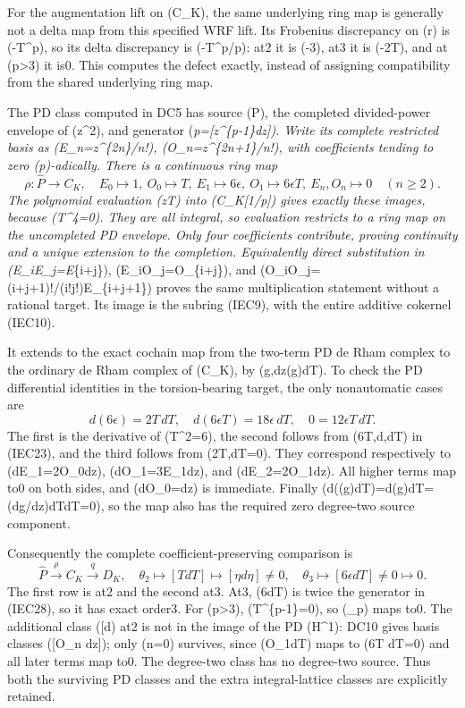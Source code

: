 \documentclass[
  10pt,
]{article}
\begin{document}
For the augmentation lift on (C\_K), the same underlying ring map is
generally not a delta map from this specified WRF lift. Its Frobenius
discrepancy on (r) is (-T\^{}p), so its delta discrepancy is
(-T\^{}p/p): at2 it is (-3\epsilon), at3 it is (-2\epsilon T), and at
(p\textgreater3) it is0. This computes the defect exactly, instead of
assigning compatibility from the shared underlying ring map.

The PD class computed in DC5 has source (\widehat P), the completed
divided-power envelope of (z\^{}2), and generator
(\theta\emph{p={[}z\^{}\{p-1\}dz{]}). Write its complete restricted
basis as (E\_n=z\^{}\{2n\}/n!), (O\_n=z\^{}\{2n+1\}/n!), with
coefficients tending to zero (p)-adically. There is a continuous ring
map \[
\rho:\widehat P\longrightarrow C_K,\quad
E_0\mapsto1,\ O_0\mapsto T,\ E_1\mapsto6\epsilon,
\ O_1\mapsto6\epsilon T,\ E_n,O_n\mapsto0\quad(n\ge2).
\tag{IEC38}
\] The polynomial evaluation (z\mapsto T) into (C\_K{[}1/p{]}) gives
exactly these images, because (T\^{}4=0). They are all integral, so
evaluation restricts to a ring map on the uncompleted PD envelope. Only
four coefficients contribute, proving continuity and a unique extension
to the completion. Equivalently direct substitution in
(E\_iE\_j=E}\{i+j\}), (E\_iO\_j=O\_\{i+j\}),
and (O\_iO\_j=(i+j+1)!/(i!j!)E\_\{i+j+1\}) proves the same
multiplication statement without a rational target. Its image is the
subring (IEC9), with the entire additive cokernel (IEC10).

It extends to the exact cochain map from the two-term PD de Rham complex
to the ordinary de Rham complex of (C\_K), by (g,dz\mapsto\rho(g)dT). To
check the PD differential identities in the torsion-bearing target, the
only nonautomatic cases are \[
d(6\epsilon)=2T\,dT,\quad
d(6\epsilon T)=18\epsilon\,dT,\quad
0=12\epsilon T\,dT.
\tag{IEC39}
\] The first is the derivative of (T\^{}2=6\epsilon), the second follows
from (6T,d\epsilon,dT) in (IEC23), and the third follows from
(2\epsilon T,dT=0). They correspond respectively to (dE\_1=2O\_0dz),
(dO\_1=3E\_1dz), and (dE\_2=2O\_1dz). All higher terms map to0 on both
sides, and (dO\_0=dz) is immediate. Finally
(d(\rho(g)dT)=d\rho(g)\wedge dT=\rho(dg/dz)dT\wedge dT=0), so the map
also has the required zero degree-two source component.

Consequently the complete coefficient-preserving comparison is \[
\widehat P\xrightarrow{\rho}C_K\xrightarrow{q}D_K,
\quad
\theta_2\longmapsto[TdT]\longmapsto[\eta d\eta]\ne0,
\quad
\theta_3\longmapsto[6\epsilon dT]\ne0\longmapsto0.
\tag{IEC40}
\] The first row is at2 and the second at3. At3, (6\epsilon dT) is twice
the generator in (IEC28), so it has exact order3. For (p\textgreater3),
(T\^{}\{p-1\}=0), so (\theta\_p) maps to0. The additional class
({[}\epsilon d\epsilon{]}) at2 is not in the image of the PD (H\^{}1):
DC10 gives basis classes ({[}O\_n dz{]}); only (n=0) survives, since
(O\_1dT) maps to (6\epsilon T dT=0) and all later terms map to0. The
degree-two class has no degree-two source. Thus both the surviving PD
classes and the extra integral-lattice classes are explicitly retained.
\end{document}
